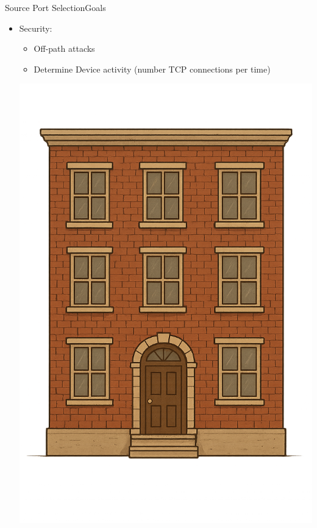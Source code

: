 \documentclass[aspectratio=169, hyperref={colorlinks=true, allcolors=SecondaryColor}, c]{beamer}
\begin{document}
	\begin{frame}[fragile]{Source Port Selection}{Goals}
		\begin{itemize}
			\item \alert{Security:}
			\begin{itemize}
				\item \alert{Off-path attacks} %
				\item Determine \alert{Device activity (number TCP connections per time)} %
			\end{itemize}
			\begin{transformation}[0.2][0.6][0.2]
				\includegraphics[width=\textwidth]{./figures/apartment1.png}

\end{transformation}
\end{itemize}
\end{frame}
\end{document}
